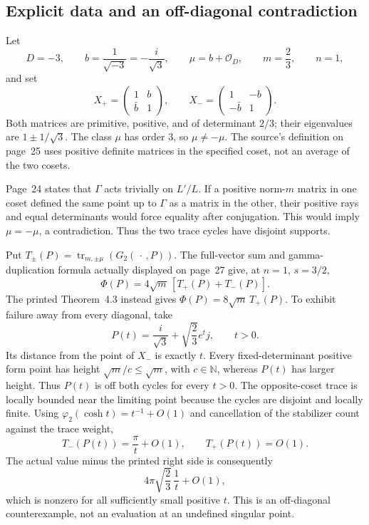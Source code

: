 \documentclass[10pt]{article}
\begin{document}
\subsection*{Explicit data and an off-diagonal contradiction}
Let \[D=-3,\qquad b=\frac1{\sqrt{-3}}=-\frac{i}{\sqrt3},
 \qquad \mu=b+\mathcal O_D,\qquad m=\frac23,\qquad n=1,\] and set \[X_+=\begin{pmatrix}1&b\\\bar b&1\end{pmatrix},
 \qquad
 X_-=\begin{pmatrix}1&-b\\-\bar b&1\end{pmatrix}.\] Both matrices are primitive, positive, and of determinant \(2/3\); their eigenvalues are \(1\pm1/\sqrt3\). The class \(\mu\) has order \(3\), so \(\mu\ne-\mu\). The source’s definition on page 25 uses positive definite matrices in the specified coset, not an average of the two cosets.\par
Page 24 states that \(\Gamma\) acts trivially on \(L'/L\). If a positive norm-\(m\) matrix in one coset defined the same point up to \(\Gamma\) as a matrix in the other, their positive rays and equal determinants would force equality after conjugation. This would imply \(\mu=-\mu\), a contradiction. Thus the two trace cycles have disjoint supports.\par
Put \(T_\pm(P)=\operatorname{tr}_{m,\pm\mu}(G_2(\,\cdot\,,P))\). The full-vector sum and gamma-duplication formula actually displayed on page 27 give, at \(n=1\), \(s=3/2\), \[\Phi(P)=4\sqrt m\,[T_+(P)+T_-(P)].\] The printed Theorem 4.3 instead gives \(\Phi(P)=8\sqrt m\,T_+(P)\). To exhibit failure away from every diagonal, take \[P(t)=\frac{i}{\sqrt3}+\sqrt{\frac23}e^t j,\qquad t>0.\] Its distance from the point of \(X_-\) is exactly \(t\). Every fixed-determinant positive form point has height \(\sqrt m/c\leq\sqrt m\), with \(c\in\mathbb N\), whereas \(P(t)\) has larger height. Thus \(P(t)\) is off both cycles for every \(t>0\). The opposite-coset trace is locally bounded near the limiting point because the cycles are disjoint and locally finite. Using \(\varphi_2(\cosh t)=t^{-1}+O(1)\) and cancellation of the stabilizer count against the trace weight, \[T_-(P(t))=\frac{\pi}{t}+O(1),\qquad T_+(P(t))=O(1).\] The actual value minus the printed right side is consequently \[4\pi\sqrt{\frac23}\,\frac1t+O(1),\] which is nonzero for all sufficiently small positive \(t\). This is an off-diagonal counterexample, not an evaluation at an undefined singular point.\par
\end{document}
